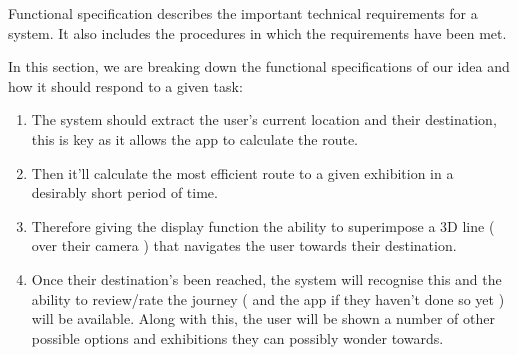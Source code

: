 

Functional specification describes the important technical requirements for a system. It also includes the procedures in which the requirements have been met.

In this section, we are breaking down the functional specifications of our idea and how it should respond to a given task:


\begin{enumerate}
    \item The system should extract the user's current location and their destination, this is key as it allows the app to calculate the route.
    \item Then it'll calculate the most efficient route to a given exhibition in a desirably short period of time.
    \item Therefore giving the display function the ability to superimpose a 3D line ( over their camera ) that navigates the user towards their destination. 
    \item Once their destination's been reached, the system will recognise this and the ability to review/rate the journey ( and the app if they haven't done so yet ) will be available. Along with this, the user will be shown a number of other possible options and exhibitions they can possibly wonder towards.
\end{enumerate}
                                      
